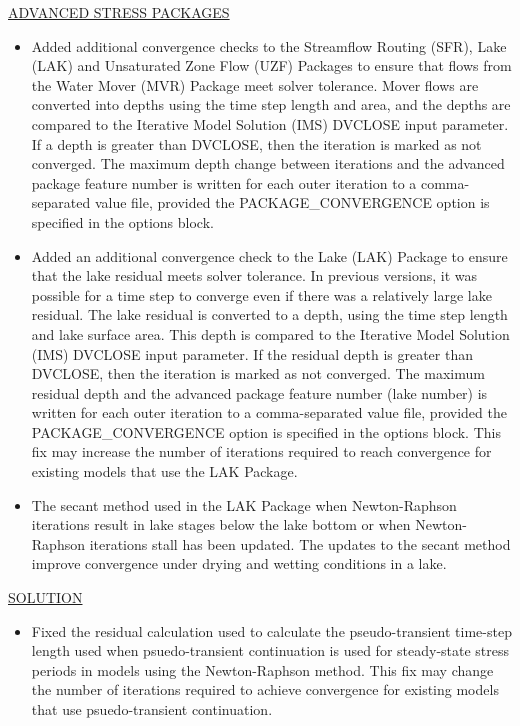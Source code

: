 	\underline{ADVANCED STRESS PACKAGES}
	\begin{itemize}
		\item Added additional convergence checks to the Streamflow Routing (SFR), Lake (LAK) and Unsaturated Zone Flow (UZF) Packages to ensure that flows from the Water Mover (MVR) Package meet solver tolerance.  Mover flows are converted into depths using the time step length and area, and the depths are compared to the Iterative Model Solution (IMS) DVCLOSE input parameter.  If a depth is greater than DVCLOSE, then the iteration is marked as not converged.  The maximum depth change between iterations and the advanced package feature number is written for each outer iteration to a comma-separated value file, provided the PACKAGE\_CONVERGENCE option is specified in the options block.
		\item Added an additional convergence check to the Lake (LAK) Package to ensure that the lake residual meets solver tolerance. In previous versions, it was possible for a time step to converge even if there was a relatively large lake residual. The lake residual is converted to a depth, using the time step length and lake surface area. This depth is compared to the Iterative Model Solution (IMS) DVCLOSE input parameter. If the residual depth is greater than DVCLOSE, then the iteration is marked as not converged. The maximum residual depth and the advanced package feature number (lake number) is written for each outer iteration to a comma-separated value file, provided the PACKAGE\_CONVERGENCE option is specified in the options block. This fix may increase the number of iterations required to reach convergence for existing models that use the LAK Package.
		\item The secant method used in the LAK Package when Newton-Raphson iterations result in lake stages below the lake bottom or when Newton-Raphson iterations stall has been updated. The updates to the secant method improve convergence under drying and wetting conditions in a lake. 		
	\end{itemize}

	\underline{SOLUTION}
	\begin{itemize}
		\item Fixed the residual calculation used to calculate the pseudo-transient time-step length used when psuedo-transient continuation is used for steady-state stress periods in models using the Newton-Raphson method. This fix may change the number of iterations required to achieve convergence for existing models that use psuedo-transient continuation. 
	\end{itemize}



